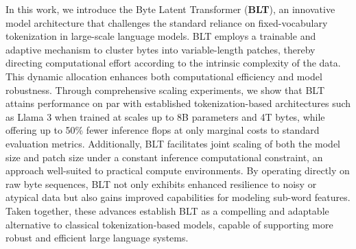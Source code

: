 In this work, we introduce the Byte Latent Transformer (\textbf{BLT}), an innovative model architecture that challenges the standard reliance on fixed-vocabulary tokenization in large-scale language models. {\textsc BLT} employs a trainable and adaptive mechanism to cluster bytes into variable-length patches, thereby directing computational effort according to the intrinsic complexity of the data. This dynamic allocation enhances both computational efficiency and model robustness. Through comprehensive scaling experiments, we show that {\textsc BLT} attains performance on par with established tokenization-based architectures such as Llama 3 when trained at scales up to 8B parameters and 4T bytes, while offering up to 50\% fewer inference flops at only marginal costs to standard evaluation metrics. Additionally, {\textsc BLT} facilitates joint scaling of both the model size and patch size under a constant inference computational constraint, an approach well-suited to practical compute environments. By operating directly on raw byte sequences, {\textsc BLT} not only exhibits enhanced resilience to noisy or atypical data but also gains improved capabilities for modeling sub-word features. Taken together, these advances establish {\textsc BLT} as a compelling and adaptable alternative to classical tokenization-based models, capable of supporting more robust and efficient large language systems.

